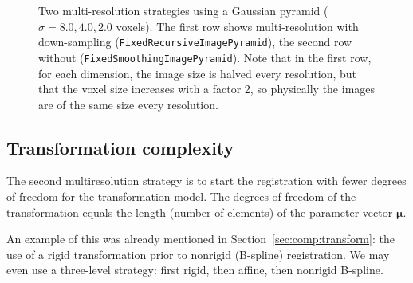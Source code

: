 \documentclass[]{report}
\newcommand{\vmu}{\bm{\mu}}
\begin{document}
\begin{figure}
\caption{Two multi-resolution strategies using a Gaussian pyramid
($\sigma = 8.0, 4.0, 2.0$ voxels). The first row shows
multi-resolution with down-sampling
(\texttt{FixedRecursiveImagePyramid}), the second row without
(\texttt{FixedSmoothingImagePyramid}). Note that in the first row,
for each dimension, the image size is halved every resolution, but
that the voxel size increases with a factor 2, so physically the
images are of the same size every resolution.}
\label{fig:multiresolution}
\end{figure}

\subsection{Transformation complexity}

The second multiresolution strategy is to start the registration
with fewer degrees of freedom for the transformation model. The
degrees of freedom of the transformation equals the length (number
of elements) of the parameter vector $\vmu$.

An example of this was already mentioned in Section~\ref{sec:comp:transform}:
the use of a rigid transformation prior to nonrigid (B-spline) registration. We
may even use a three-level strategy: first rigid, then affine, then nonrigid
B-spline.
\end{document}
